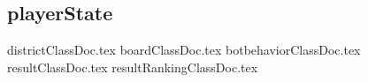 \subsection{playerState}
\label{ss:playerState}

{districtClassDoc.tex}
\newpage
{boardClassDoc.tex}
\newpage
{botbehaviorClassDoc.tex}
\newpage
{resultClassDoc.tex}
\newpage
{resultRankingClassDoc.tex}
